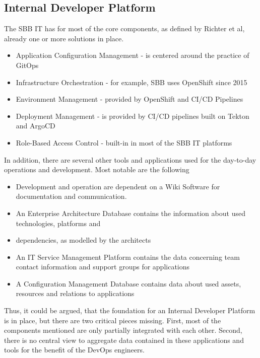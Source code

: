 \documentclass[a4paper,12pt]{article}
\begin{document}
    \subsection{Internal Developer Platform}
    The SBB IT has for most of the core components, as defined by Richter et al\parencite{richteretal}, already one or more solutions
    in place.
    \begin{itemize}
        \item Application Configuration Management - is centered around the practice of GitOps\parencite{hashicorpvault}
        \item Infrastructure Orchestration - for example, SBB uses OpenShift since 2015\parencite{rhsbbopenshift}
        \item Environment Management - provided by OpenShift and CI/CD Pipelines
        \item Deployment Management - is provided by CI/CD pipelines built on Tekton and ArgoCD\parencite{sbbtekton}
        \item Role-Based Access Control - built-in in most of the SBB IT platforms
    \end{itemize}
    In addition, there are several other tools and applications used for the day-to-day operations and development.
    Most notable are the following
    \begin{itemize}
        \item Development and operation are dependent on a Wiki Software for documentation and communication.
        \item An Enterprise Architecture Database contains the information about used technologies, platforms and
        \item dependencies, as modelled by the architects
        \item An IT Service Management Platform contains the data concerning team contact information and support groups for applications
        \item A Configuration Management Database contains data about used assets, resources and relations to applications
    \end{itemize}
    Thus, it could be argued, that the foundation for an Internal Developer Platform is in place, but there are two
    critical pieces missing.
    First, most of the components mentioned are only partially integrated with each other.
    Second, there is no central view to aggregate data contained in these applications and tools for the benefit of the DevOps engineers.
\end{document}
